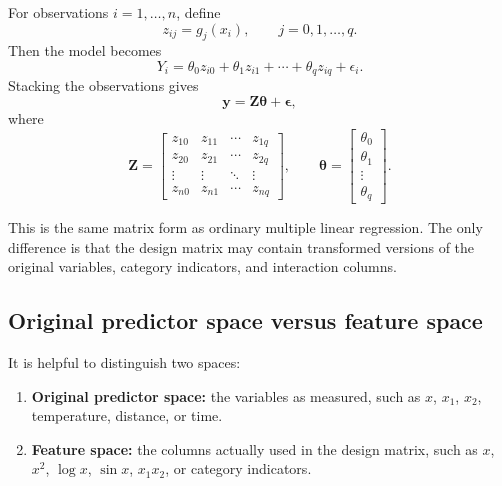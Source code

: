 For observations \(i=1,\ldots,n\), define
\begin{equation}
  z_{ij}=g_j(x_i),\qquad j=0,1,\ldots,q.
\end{equation}
Then the model becomes
\begin{equation}
  Y_i=\theta_0z_{i0}+\theta_1z_{i1}+\cdots+\theta_qz_{iq}+\epsilon_i.
\end{equation}
Stacking the observations gives
\begin{equation}
  \mathbf{y}=\mathbf{Z}\boldsymbol{\theta}+\boldsymbol{\epsilon},
  \label{eq:ch11-z-model}
\end{equation}
where
\begin{equation}
  \mathbf{Z}=\begin{bmatrix}
    z_{10} & z_{11} & \cdots & z_{1q} \\
    z_{20} & z_{21} & \cdots & z_{2q} \\
    \vdots & \vdots & \ddots & \vdots \\
    z_{n0} & z_{n1} & \cdots & z_{nq}
  \end{bmatrix},
  \qquad
  \boldsymbol{\theta}=\begin{bmatrix}
    \theta_0\\ \theta_1\\ \vdots\\ \theta_q
  \end{bmatrix}.
\end{equation}

This is the same matrix form as ordinary multiple linear regression.  The only difference is that the design matrix may contain transformed versions of the original variables, category indicators, and interaction columns.

\subsection*{Original predictor space versus feature space}

It is helpful to distinguish two spaces:
\begin{enumerate}
  \item \textbf{Original predictor space:} the variables as measured, such as \(x\), \(x_1\), \(x_2\), temperature, distance, or time.
  \item \textbf{Feature space:} the columns actually used in the design matrix, such as \(x\), \(x^2\), \(\log x\), \(\sin x\), \(x_1x_2\), or category indicators.
\end{enumerate}

